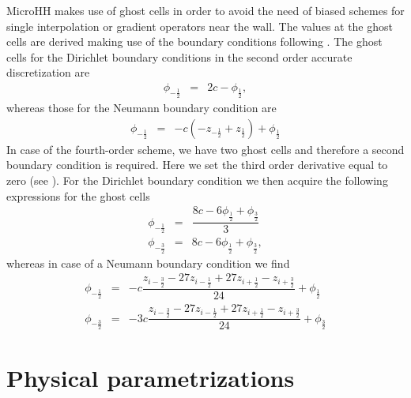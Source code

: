 \documentclass[gmd]{copernicus}
\begin{document}
MicroHH makes use of ghost cells in order to avoid the need of biased schemes for single interpolation or gradient operators near the wall. The values at the ghost cells are derived making use of the boundary conditions following \citet{Morinishi1998}. The ghost cells for the Dirichlet boundary conditions in the second order accurate discretization are
\begin{eqnarray}
\phi_{-\frac{1}{2}} & = & 2 c - \phi_{\frac{1}{2}},
\end{eqnarray}
whereas those for the Neumann boundary condition are
\begin{eqnarray}
\phi_{-\frac{1}{2}} & = & -c \left( - z_{-\frac{1}{2}} + z_{\frac{1}{2}} \right) + \phi_{\frac{1}{2}}
\end{eqnarray}
In case of the fourth-order scheme, we have two ghost cells and therefore a second boundary condition is required. Here we set the third order derivative equal to zero (see \citet{Morinishi1998}). For the Dirichlet boundary condition we then acquire the following expressions for the ghost cells
\begin{eqnarray}
\phi_{-\frac{1}{2}} & = & \dfrac{8 c - 6 \phi_{\frac{1}{2}} + \phi_{\frac{3}{2}}}{3} \\
\phi_{-\frac{3}{2}} & = & 8 c - 6 \phi_{\frac{1}{2}} + \phi_{\frac{3}{2}},
\end{eqnarray}
whereas in case of a Neumann boundary condition we find
\begin{eqnarray}
\phi_{-\frac{1}{2}} & = & -c  \dfrac{z_{i-\frac{3}{2}} - 27 z_{i-\frac{1}{2}} + 27 z_{i+\frac{1}{2}} - z_{i+\frac{3}{2}}}{24} + \phi_{\frac{1}{2}} \\
\phi_{-\frac{3}{2}} & = & -3c \dfrac{z_{i-\frac{3}{2}} - 27 z_{i-\frac{1}{2}} + 27 z_{i+\frac{1}{2}} - z_{i+\frac{3}{2}}}{24} + \phi_{\frac{3}{2}}
\end{eqnarray}

\section{Physical parametrizations}\label{sec:parametrizations}
\end{document}
